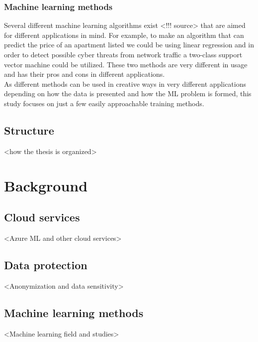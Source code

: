 \documentclass[english, 12pt, a4paper, elec, utf8, a-1b, online]{aaltothesis}
\begin{document}
\subsubsection*{Machine learning methods}
Several different machine learning algorithms exist
<!!! source>
that are aimed for different applications in mind.
For example,
to make an algorithm that can predict
the price of an apartment listed\cite{Winky}
we could be using linear regression
and in order to detect
possible cyber threats from network traffic\cite{Ghanem}
a two-class support vector machine could be utilized.
These two methods are very different in usage
and has their pros and cons in different applications.
\\
As different methods can be used in creative ways
in very different applications
depending on how the data is presented
and how the ML problem is formed,
this study focuses on
just a few easily approachable training methods.


\subsection{Structure}
<how the thesis is organized>




\clearpage




\section{Background}

\subsection{Cloud services}
<Azure ML and other cloud services>

\subsection{Data protection}
<Anonymization and data sensitivity>

\subsection{Machine learning methods}
<Machine learning field and studies>
\end{document}
